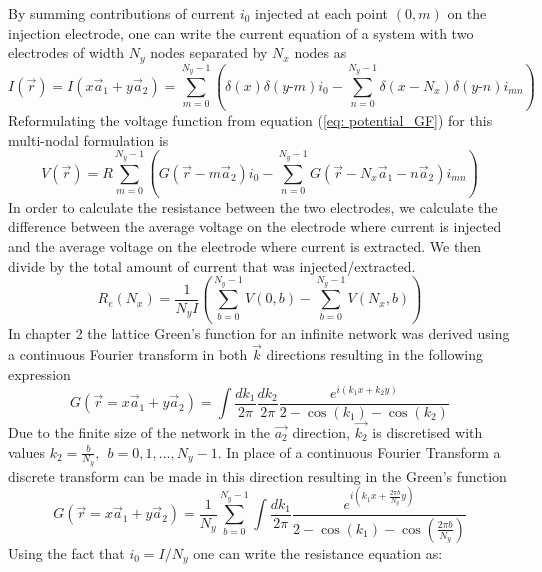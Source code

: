 By summing contributions of current $i_0$ injected at each point $(0,\textit{m})$ on the injection electrode, one can write the current equation of a system with two electrodes of width $N_y$ nodes separated by $N_x$ nodes as
\begin{equation}
I(\vec{r})=I(x\vec{a}_1 + y\vec{a}_2) = \sum_{\textit{m}=0}^{N_y-1}\left( \delta(x)\delta(\textit{y-m}) i_0 - \sum_{\textit{n}=0}^{N_y-1} \delta(x - N_x) \delta(\textit{y-n})  i_{\textit{mn}} \right)
\end{equation}
Reformulating the voltage function from equation (\ref{eq: potential_GF}) for this multi-nodal formulation is
\begin{equation}
V(\vec{r}) = R \sum_{\textit{m}=0}^{N_y-1}\left(G(\vec{r}-\textit{m}\vec{a}_2)i_0 - \sum_{\textit{n}=0}^{N_y-1}G(\vec{r} - N_x\vec{a}_1 - \textit{n}\vec{a}_2) i_{\textit{mn}}  \right)
\label{eq: voltage}
\end{equation}
In order to calculate the resistance between the two electrodes, we calculate the difference between the average voltage on the electrode where current is injected and the average voltage on the electrode where current is extracted. We then divide by the total amount of current that was injected/extracted.
\begin{equation}
R_{e}(N_x) = \frac{1}{N_y I}\left(\sum_{\textit{b}=0}^{N_y-1}V(0,\textit{b}) - \sum_{\textit{b}=0}^{N_y-1}V(N_x,\textit{b})\right)
\end{equation}
In chapter 2 the lattice Green's function for an infinite network was derived using a continuous Fourier transform in both $\vec{k}$ directions resulting in the following expression
\begin{equation}
G(\vec{r} = x \vec{a}_1 + y \vec{a}_2) =   \int \frac{dk_1}{2 \pi} \frac{dk_2}{2 \pi} \frac{e^{i(k_1  x +  k_2 y)}}{2 - \cos(k_1) - \cos(k_2)}
\end{equation}
Due to the finite size of the network in the $\vec{a_2}$ direction, $\vec{k_2}$ is discretised with values $k_2 = \frac{\textit{b}}{N_y}, ~~\textit{b} = 0,1,...,N_y-1$. In place of a continuous Fourier Transform a discrete transform can be made in this direction resulting in the Green's function
\begin{equation}
G(\vec{r} = x \vec{a}_1 + y \vec{a}_2) = \frac{1}{N_y}\sum_{b=0}^{N_y-1} \int \frac{dk_1}{2 \pi} \frac{e^{i(k_1  x +  \frac{2 \pi b}{N_y} y)}}{2 - \cos(k_1) - \cos(\frac{2 \pi b}{N_y})}
\label{eq: gf_finite}
\end{equation}
Using the fact that $i_0 = I/N_y$ one can write the resistance equation as:
